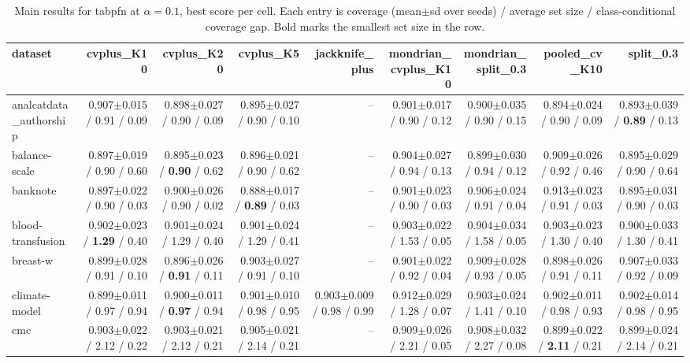 \begin{table}[t]
\centering
\small
\caption{Main results for tabpfn at $\alpha=0.1$, best score per cell. Each entry is coverage (mean$\pm$sd over seeds) / average set size / class-conditional coverage gap. Bold marks the smallest set size in the row.}
\label{tab:main}
\begin{tabular}{lrrrrrrrr}
\toprule
dataset & cvplus\_K10 & cvplus\_K20 & cvplus\_K5 & jackknife\_plus & mondrian\_cvplus\_K10 & mondrian\_split\_0.3 & pooled\_cv\_K10 & split\_0.3 \\
\midrule
analcatdata\_authorship & 0.907$\pm$0.015 / 0.91 / 0.09 & 0.898$\pm$0.027 / 0.90 / 0.09 & 0.895$\pm$0.027 / 0.90 / 0.10 & -- & 0.901$\pm$0.017 / 0.90 / 0.12 & 0.900$\pm$0.035 / 0.90 / 0.15 & 0.894$\pm$0.024 / 0.90 / 0.09 & 0.893$\pm$0.039 / \textbf{0.89} / 0.13 \\
balance-scale & 0.897$\pm$0.019 / 0.90 / 0.60 & 0.895$\pm$0.023 / \textbf{0.90} / 0.62 & 0.896$\pm$0.021 / 0.90 / 0.62 & -- & 0.904$\pm$0.027 / 0.94 / 0.13 & 0.899$\pm$0.030 / 0.94 / 0.12 & 0.909$\pm$0.026 / 0.92 / 0.46 & 0.895$\pm$0.029 / 0.90 / 0.64 \\
banknote & 0.897$\pm$0.022 / 0.90 / 0.03 & 0.900$\pm$0.026 / 0.90 / 0.02 & 0.888$\pm$0.017 / \textbf{0.89} / 0.03 & -- & 0.901$\pm$0.023 / 0.90 / 0.03 & 0.906$\pm$0.024 / 0.91 / 0.04 & 0.913$\pm$0.023 / 0.91 / 0.03 & 0.895$\pm$0.031 / 0.90 / 0.03 \\
blood-transfusion & 0.902$\pm$0.023 / \textbf{1.29} / 0.40 & 0.901$\pm$0.024 / 1.29 / 0.40 & 0.901$\pm$0.024 / 1.29 / 0.41 & -- & 0.903$\pm$0.022 / 1.53 / 0.05 & 0.904$\pm$0.034 / 1.58 / 0.05 & 0.903$\pm$0.023 / 1.30 / 0.40 & 0.900$\pm$0.033 / 1.30 / 0.41 \\
breast-w & 0.899$\pm$0.028 / 0.91 / 0.10 & 0.896$\pm$0.026 / \textbf{0.91} / 0.11 & 0.903$\pm$0.027 / 0.91 / 0.10 & -- & 0.901$\pm$0.022 / 0.92 / 0.04 & 0.909$\pm$0.028 / 0.93 / 0.05 & 0.898$\pm$0.026 / 0.91 / 0.11 & 0.907$\pm$0.033 / 0.92 / 0.09 \\
climate-model & 0.899$\pm$0.011 / 0.97 / 0.94 & 0.900$\pm$0.011 / \textbf{0.97} / 0.94 & 0.901$\pm$0.010 / 0.98 / 0.95 & 0.903$\pm$0.009 / 0.98 / 0.99 & 0.912$\pm$0.029 / 1.28 / 0.07 & 0.903$\pm$0.024 / 1.41 / 0.10 & 0.902$\pm$0.011 / 0.98 / 0.93 & 0.902$\pm$0.014 / 0.98 / 0.95 \\
cmc & 0.903$\pm$0.022 / 2.12 / 0.22 & 0.903$\pm$0.021 / 2.12 / 0.21 & 0.905$\pm$0.021 / 2.14 / 0.21 & -- & 0.909$\pm$0.026 / 2.21 / 0.05 & 0.908$\pm$0.032 / 2.27 / 0.08 & 0.899$\pm$0.022 / \textbf{2.11} / 0.21 & 0.899$\pm$0.024 / 2.14 / 0.21 \\

\end{tabular}
\end{table}
